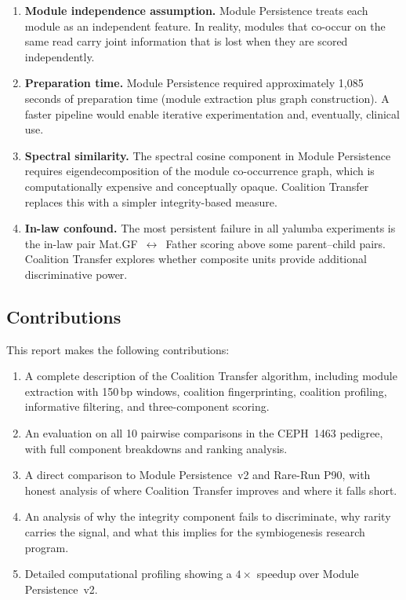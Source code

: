 \documentclass{../yalumba}
\begin{document}
\begin{enumerate}
  \item \textbf{Module independence assumption.}  Module Persistence treats each
        module as an independent feature.  In reality, modules that co-occur on
        the same read carry joint information that is lost when they are scored
        independently.
  \item \textbf{Preparation time.}  Module Persistence required approximately
        1{,}085 seconds of preparation time (module extraction plus graph
        construction).  A faster pipeline would enable iterative experimentation
        and, eventually, clinical use.
  \item \textbf{Spectral similarity.}  The spectral cosine component in
        Module Persistence requires eigendecomposition of the module co-occurrence
        graph, which is computationally expensive and conceptually opaque.
        Coalition Transfer replaces this with a simpler integrity-based measure.
  \item \textbf{In-law confound.}  The most persistent failure in all yalumba
        experiments is the in-law pair Mat.GF~$\leftrightarrow$~Father scoring
        above some parent--child pairs.  Coalition Transfer explores whether
        composite units provide additional discriminative power.
\end{enumerate}

\subsection{Contributions}

This report makes the following contributions:

\begin{enumerate}
  \item A complete description of the Coalition Transfer algorithm, including
        module extraction with 150\,bp windows, coalition fingerprinting,
        coalition profiling, informative filtering, and three-component scoring.
  \item An evaluation on all 10 pairwise comparisons in the CEPH~1463 pedigree,
        with full component breakdowns and ranking analysis.
  \item A direct comparison to Module Persistence~v2 and Rare-Run P90, with
        honest analysis of where Coalition Transfer improves and where it falls
        short.
  \item An analysis of why the integrity component fails to discriminate, why
        rarity carries the signal, and what this implies for the symbiogenesis
        research program.
  \item Detailed computational profiling showing a $4{\times}$ speedup over
        Module Persistence~v2.
\end{enumerate}
\end{document}
